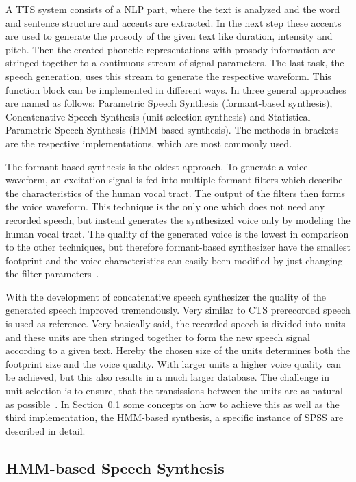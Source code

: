 A \ac{TTS} system consists of a \ac{NLP} part, where the text is analyzed and the word and sentence structure and accents are extracted. In the next step these accents are used to generate the prosody of the given text like duration, intensity and pitch. Then the created phonetic representations with prosody information are stringed together to a continuous stream of signal parameters. The last task, the speech generation, uses this stream to generate the respective waveform. This function block can be implemented in different ways. In \cite{hinterleitner:quality} three general approaches are named as follows: Parametric Speech Synthesis (formant-based synthesis), Concatenative Speech Synthesis (unit-selection synthesis) and Statistical Parametric Speech Synthesis (\ac{HMM}-based synthesis). The methods in brackets are the respective implementations, which are most commonly used. 

The formant-based synthesis is the oldest approach. To generate a voice waveform, an excitation signal is fed into multiple formant filters which describe the characteristics of the human vocal tract. The output of the filters then forms the voice waveform. This technique is the only one which does not need any recorded speech, but instead generates the synthesized voice only by modeling the human vocal tract. The quality of the generated voice is the lowest in comparison to the other techniques, but therefore formant-based synthesizer have the smallest footprint and the voice characteristics can easily been modified by just changing the filter parameters~\cite{hinterleitner:quality}.

With the development of concatenative speech synthesizer the quality of the generated speech improved tremendously. Very similar to \ac{CTS} prerecorded speech is used as reference. Very basically said, the recorded speech is divided into units and these units are then stringed together to form the new speech signal according to a given text. Hereby the chosen size of the units determines both the footprint size and the voice quality. With larger units a higher voice quality can be achieved, but this also results in a much larger database. The challenge in unit-selection is to ensure, that the transissions between the units are as natural as possible~\cite{hinterleitner:quality}. In Section~\ref{subsec:hmmspeech} some concepts on how to achieve this as well as the third implementation, the \ac{HMM}-based synthesis, a specific instance of \ac{SPSS} are described in detail.

\subsection{\ac{HMM}-based Speech Synthesis}
\label{subsec:hmmspeech}


